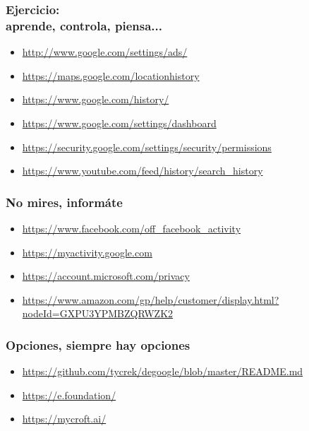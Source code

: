 \documentclass[17pt,aspectratio=169]{beamer}
\begin{document}
\begin{frame}
\frametitle{Ejercicio: \\ aprende, controla, piensa...}


{\small
\begin{itemize}
  \item \url{http://www.google.com/settings/ads/}
  \item \url{https://maps.google.com/locationhistory}
  \item \url{https://www.google.com/history/}
  \item \url{https://www.google.com/settings/dashboard}
  \item \url{https://security.google.com/settings/security/permissions}
  \item \url{https://www.youtube.com/feed/history/search_history}
  \end{itemize}
}
\end{frame}


\begin{frame}
\frametitle{No mires, informáte}


{\small
\begin{itemize}
\item \url{https://www.facebook.com/off_facebook_activity}
\item \url{https://myactivity.google.com}
\item \url{https://account.microsoft.com/privacy}
\item \url{https://www.amazon.com/gp/help/customer/display.html?nodeId=GXPU3YPMBZQRWZK2}
\end{itemize}
}
\end{frame}


\begin{frame}
\frametitle{Opciones, siempre hay opciones}


{\small
\begin{itemize}
\item \url{https://github.com/tycrek/degoogle/blob/master/README.md}
\item \url{https://e.foundation/}
\item \url{https://mycroft.ai/}
  \end{itemize}
}
\end{frame}

\end{document}
